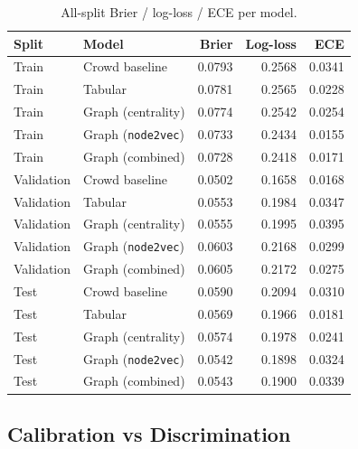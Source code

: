 \documentclass{article} %
\begin{document}
\begin{table}[t]
\caption{All-split Brier / log-loss / ECE per model.}
\label{tab:per-split}
\begin{center}
\small
\begin{tabular}{@{}llrrr@{}}
\toprule
\textbf{Split} & \textbf{Model} & \textbf{Brier} & \textbf{Log-loss} & \textbf{ECE} \\
\midrule
Train      & Crowd baseline             & 0.0793 & 0.2568 & 0.0341 \\
Train      & Tabular                    & 0.0781 & 0.2565 & 0.0228 \\
Train      & Graph (centrality)         & 0.0774 & 0.2542 & 0.0254 \\
Train      & Graph (\texttt{node2vec})  & 0.0733 & 0.2434 & 0.0155 \\
Train      & Graph (combined)           & 0.0728 & 0.2418 & 0.0171 \\
\midrule
Validation & Crowd baseline             & 0.0502 & 0.1658 & 0.0168 \\
Validation & Tabular                    & 0.0553 & 0.1984 & 0.0347 \\
Validation & Graph (centrality)         & 0.0555 & 0.1995 & 0.0395 \\
Validation & Graph (\texttt{node2vec})  & 0.0603 & 0.2168 & 0.0299 \\
Validation & Graph (combined)           & 0.0605 & 0.2172 & 0.0275 \\
\midrule
Test       & Crowd baseline             & 0.0590 & 0.2094 & 0.0310 \\
Test       & Tabular                    & 0.0569 & 0.1966 & 0.0181 \\
Test       & Graph (centrality)         & 0.0574 & 0.1978 & 0.0241 \\
Test       & Graph (\texttt{node2vec})  & 0.0542 & 0.1898 & 0.0324 \\
Test       & Graph (combined)           & 0.0543 & 0.1900 & 0.0339 \\
\bottomrule
\end{tabular}
\end{center}
\end{table}

\subsection{Calibration vs Discrimination}
\end{document}
